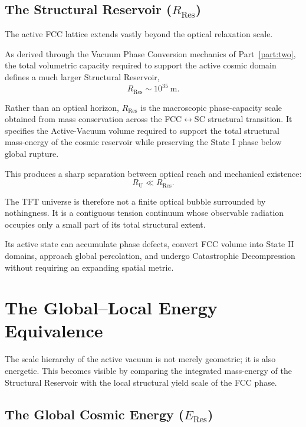 \subsection{The Structural Reservoir ($R_{\mathrm{Res}}$)}
\label{subsec:structural_reservoir_macro}

The active FCC lattice extends vastly beyond the optical relaxation scale.

As derived through the Vacuum Phase Conversion mechanics of Part~\ref{part:two}, the total volumetric capacity required to support the active cosmic domain defines a much larger Structural Reservoir,
\begin{equation}
    R_{\mathrm{Res}}
    \sim
    10^{35}\ \mathrm{m}.
\end{equation}

Rather than an optical horizon, $R_{\mathrm{Res}}$ is the macroscopic phase-capacity scale obtained from mass conservation across the FCC$\leftrightarrow$SC structural transition. It specifies the Active-Vacuum volume required to support the total structural mass-energy of the cosmic reservoir while preserving the State I phase below global rupture.

This produces a sharp separation between optical reach and mechanical existence:
\begin{equation}
    R_{\mathrm U}
    \ll
    R_{\mathrm{Res}}.
\end{equation}

The TFT universe is therefore not a finite optical bubble surrounded by nothingness. It is a contiguous tension continuum whose observable radiation occupies only a small part of its total structural extent.

Its active state can accumulate phase defects, convert FCC volume into State II domains, approach global percolation, and undergo Catastrophic Decompression without requiring an expanding spatial metric.


\section{The Global--Local Energy Equivalence}
\label{sec:global_local_energy_equivalence}

The scale hierarchy of the active vacuum is not merely geometric; it is also energetic. This becomes visible by comparing the integrated mass-energy of the Structural Reservoir with the local structural yield scale of the FCC phase.


\subsection{The Global Cosmic Energy ($E_{\mathrm{Res}}$)}

